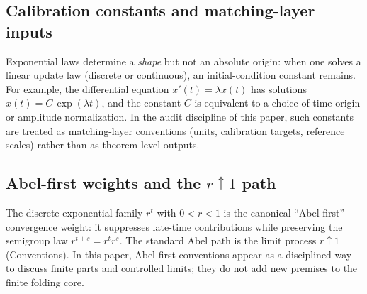 \subsection{Calibration constants and matching-layer inputs}
\label{subsec:arrow_time_calibration_constants}

\InterfaceTag Exponential laws determine a \emph{shape} but not an absolute origin: when one solves a linear update law (discrete or continuous), an initial-condition constant remains.
For example, the differential equation $x'(t)=\lambda x(t)$ has solutions $x(t)=C\,\exp(\lambda t)$, and the constant $C$ is equivalent to a choice of time origin or amplitude normalization.
In the audit discipline of this paper, such constants are treated as matching-layer conventions (units, calibration targets, reference scales) rather than as theorem-level outputs.

\subsection{Abel-first weights and the \texorpdfstring{$r\uparrow 1$}{r->1} path}
\label{subsec:arrow_time_abel_first}

\MathTag The discrete exponential family $r^t$ with $0<r<1$ is the canonical ``Abel-first'' convergence weight: it suppresses late-time contributions while preserving the semigroup law $r^{t+s}=r^t r^s$.
The standard Abel path is the limit process $r\uparrow 1$ (Conventions).
In this paper, Abel-first conventions appear as a disciplined way to discuss finite parts and controlled limits; they do not add new premises to the finite folding core.


